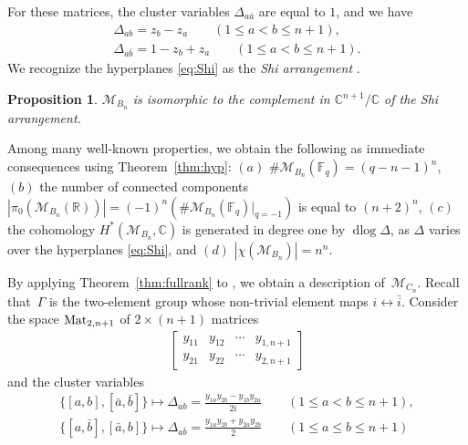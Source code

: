 \documentclass[10pt,a4paper]{amsart}
\def\R{{\mathbb R}}
\def\C{{\mathbb C}}
\def\F{{\mathbb F}}
\def\M{{\mathcal{M}}}
\def\dlog{\operatorname{dlog}}
\numberwithin{equation}{section}
\newtheorem{Proposition}[Theorem]{Proposition}
\begin{document}
For these matrices, the cluster variables $\Delta_{a \bar a}$ are equal to $1$, and we have\vspace{-.5ex}
\begin{gather}
\Delta_{ab} = z_b-z_a \qquad (1 \leq a < b \leq n+1),\nonumber
\\
\Delta_{a \bar b} = 1 - z_b + z_a \qquad (1 \leq a < b \leq n+1).
\label{eq:Shi}
\end{gather}
We recognize the hyperplanes \eqref{eq:Shi} as the \emph{Shi arrangement} \cite{Shi}.
\begin{Proposition}
$\M_{B_n}$ is isomorphic to the complement in $\C^{n+1}/\C$ of the Shi arrangement.
\end{Proposition}
Among many well-known properties, we obtain the following as immediate consequences using Theorem~\ref{thm:hyp}: $(a)$ $\#\M_{B_n}(\F_q)= (q-n-1)^n $, $(b)$ the number of connected components $|\pi_0(\M_{B_n}(\R))| = (-1)^n(\#\M_{B_n}(\F_q)|_{q=-1})$ is equal to $(n+2)^n$, $(c)$ the cohomology $H^*(\M_{B_n},\C)$ is generated in degree one by $\dlog \Delta$, as $\Delta$ varies over the hyperplanes \eqref{eq:Shi}, and $(d)$ $|\chi(\M_{B_n})| \allowbreak = n^n$.

\bigskip{} %
\def\Mat{{\rm Mat}}
\def\SO{{\operatorname{SO}}}
By applying Theorem~\ref{thm:fullrank} to \cite[Example 12.12]{CA2}, we obtain a description of~$\M_{C_n}$. Recall that~$\Gamma$ is the two-element group whose non-trivial element maps $i \leftrightarrow \bar i$. Consider the space $\Mat_{2,n+1}$ of $2 \times (n+1)$ matrices\vspace{-.5ex}
\begin{gather*}
\begin{bmatrix}
y_{11} & y_{12} & \cdots & y_{1,n+1} \\
y_{21} & y_{22} & \cdots & y_{2,n+1}
\end{bmatrix}
\end{gather*}
and the cluster variables\vspace{-.5ex}
\begin{gather}
\big\{[a,b],[\bar a, \bar b]\big\} \mapsto \Delta_{ab} = \frac{y_{1a}y_{2b}-y_{1b}y_{2a}}{2i} \qquad
(1 \leq a < b \leq n+1), \nonumber
\\
\big\{[a,\bar b],[\bar a, b]\big\} \mapsto \Delta_{a \bar b} = \frac{y_{1a}y_{2b}+y_{2a}y_{2b}}{2} \qquad
(1 \leq a \leq b \leq n+1)
\label{eq:Cncluster}
\end{gather}
\end{document}

